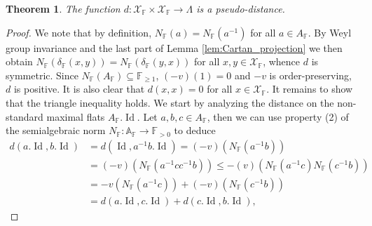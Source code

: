 \documentclass[12pt]{amsart}
\newcommand{\F}{\mathbb{F} }
\newcommand{\X}{\mathcal{X}}
\newcommand{\A}{\mathbb{A}}
\numberwithin{equation}{section}
\newtheorem{theorem}{Theorem}[section]
\theoremstyle{remark} %
\begin{document}
\begin{theorem}\label{thm:pseudodistance}
	The function $d \colon \X_\F \times \X_\F \to \Lambda$ is a pseudo-distance.
\end{theorem}
\begin{proof}
	We note that by definition, $N_\F(a) = N_\F(a^{-1})$ for all $a\in A_\F$. By Weyl group invariance and the last part of Lemma \ref{lem:Cartan_projection} we then obtain $N_\F(\delta_\F(x,y)) = N_\F(\delta_\F(y,x))$ for all $x,y\in \X_\F$, whence $d$ is symmetric.
	Since $N_\F(A_\F) \subseteq \F_{\geq 1}$, $(-v)(1)=0$ and $-v$ is order-preserving, $d$ is positive. It is also clear that $d(x,x) = 0$ for all $x\in \X_\F$. It remains to show that the triangle inequality holds. We start by analyzing the distance on the non-standard maximal flats $A_\F.\operatorname{Id}$. Let $a,b,c \in A_\F$, then we can use property (2) of the semialgebraic norm $N_\F \colon \A_\F \to \F_{>0}$ to deduce
	\begin{align*}
		d(a.\operatorname{Id},b.\operatorname{Id}) & = d(\operatorname{Id}, a^{-1}b.\operatorname{Id}) = (-v)(N_\F(a^{-1}b)) \\
		&= (-v)(N_\F(a^{-1}c c^{-1}b)) 
		\leq -(v)(N_\F(a^{-1}c) N_\F(c^{-1}b)) \\
		&= -v(N_\F(a^{-1}c)) + (-v)(N_\F(c^{-1}b)) \\
		&= d(a.\operatorname{Id},c.\operatorname{Id}) + d(c.\operatorname{Id},b.\operatorname{Id}),
	\end{align*}

\end{proof}
\end{document}
